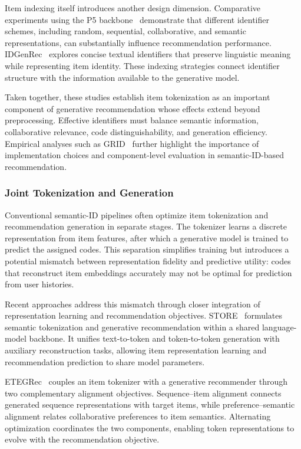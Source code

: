\documentclass[sigconf,nonacm]{acmart}
\begin{document}
Item indexing itself introduces another design
dimension. Comparative experiments using the P5
backbone~\cite{indexids} demonstrate that different
identifier schemes, including random, sequential,
collaborative, and semantic representations, can
substantially influence recommendation performance.
IDGenRec~\cite{idgenrec} explores concise textual
identifiers that preserve linguistic meaning while
representing item identity. These indexing strategies
connect identifier structure with the information
available to the generative model.

Taken together, these studies establish item
tokenization as an important component of
generative recommendation whose effects extend
beyond preprocessing. Effective identifiers
must balance semantic information, collaborative
relevance, code distinguishability, and generation
efficiency. Empirical analyses such as
GRID~\cite{grid} further highlight the importance
of implementation choices and component-level
evaluation in semantic-ID-based recommendation.

\subsubsection{Joint Tokenization and Generation}

Conventional semantic-ID pipelines often optimize
item tokenization and recommendation generation
in separate stages. The tokenizer learns a discrete
representation from item features, after which a
generative model is trained to predict the assigned
codes. This separation simplifies training but
introduces a potential mismatch between
representation fidelity and predictive utility:
codes that reconstruct item embeddings accurately
may not be optimal for prediction from user histories.

Recent approaches address this mismatch through
closer integration of representation learning and
recommendation objectives. STORE~\cite{store}
formulates semantic tokenization and generative
recommendation within a shared language-model
backbone. It unifies text-to-token and token-to-token
generation with auxiliary reconstruction tasks,
allowing item representation learning and
recommendation prediction to share model parameters.

ETEGRec~\cite{etegrec} couples an item tokenizer
with a generative recommender through two
complementary alignment objectives.
Se\-quence--\allowbreak item alignment connects generated
sequence representations with target items, while
preference--\allowbreak semantic alignment relates collaborative
preferences to item semantics. Alternating optimization
coordinates the two components, enabling token
representations to evolve with the recommendation
objective.
\end{document}
